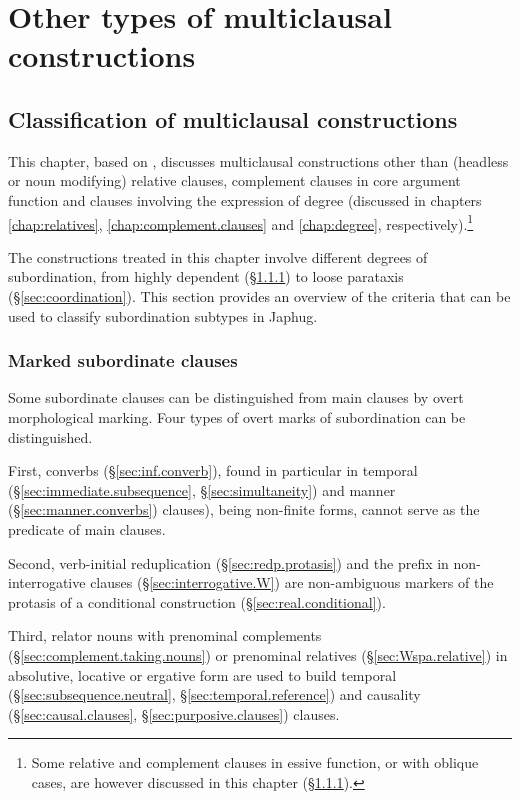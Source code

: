 \chapter{Other types of multiclausal constructions} \label{chap:temporal.conditional}


\section{Classification of multiclausal constructions }
This chapter, based on \citet{jacques14linking}, discusses multiclausal constructions other than (headless or noun modifying) relative clauses, complement clauses in core argument function and clauses involving the expression of degree (discussed in chapters \ref{chap:relatives}, \ref{chap:complement.clauses} and \ref{chap:degree}, respectively).\footnote{Some relative and complement clauses in essive function, or with oblique cases, are however discussed in this chapter (§\ref{sec:marked.subordinate}). } 

The constructions treated in this chapter involve different degrees of subordination, from highly dependent (§\ref{sec:marked.subordinate}) to loose parataxis (§\ref{sec:coordination}). This section provides an overview of the criteria that can be used to classify subordination subtypes in Japhug.

\subsection{Marked subordinate clauses}  \label{sec:marked.subordinate}
Some subordinate clauses can be distinguished from main clauses by overt morphological marking. Four types of overt marks of subordination can be distinguished.

First, converbs (§\ref{sec:inf.converb}), found in particular in temporal (§\ref{sec:immediate.subsequence}, §\ref{sec:simultaneity}) and manner (§\ref{sec:manner.converbs}) clauses), being non-finite forms, cannot serve as the predicate of main clauses. 

Second, verb-initial reduplication (§\ref{sec:redp.protasis}) and the prefix  in non-inter\-rog\-a\-tive clauses (§\ref{sec:interrogative.W}) are non-ambiguous markers of the protasis of a conditional construction (§\ref{sec:real.conditional}).

Third, relator nouns with prenominal complements (§\ref{sec:complement.taking.nouns}) or prenominal relatives (§\ref{sec:Wspa.relative}) in absolutive, locative or ergative form are used to build temporal (§\ref{sec:subsequence.neutral}, §\ref{sec:temporal.reference}) and causality (§\ref{sec:causal.clauses}, §\ref{sec:purposive.clauses}) clauses.

